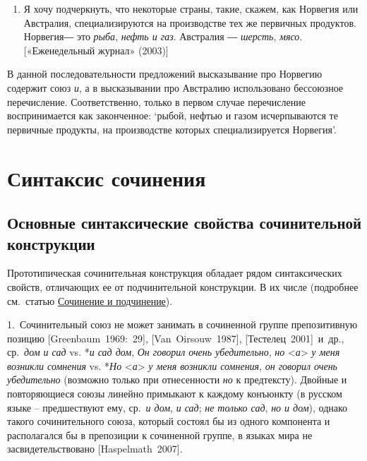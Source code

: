 \begin{enumerate}
\def\labelenumi{(\arabic{enumi})}
\setcounter{enumi}{65}
\item
  Я хочу подчеркнуть, что некоторые страны, такие, скажем, как Норвегия
  или Австралия, специализируются на производстве тех же первичных
  продуктов. Норвегия― это \emph{рыба}, \emph{нефть и газ}. Австралия ―
  \emph{шерсть}, \emph{мясо}. {[}«Еженедельный журнал» (2003){]}
\end{enumerate}

В данной последовательности предложений высказывание про Норвегию
содержит союз \emph{и}, а в высказывании про Австралию использовано
бессоюзное перечисление. Соответственно, только в первом случае
перечисление воспринимается как законченное: `рыбой, нефтью и газом
исчерпываются те первичные продукты, на производстве которых
специализируется Норвегия'.

\hypertarget{ux441ux438ux43dux442ux430ux43aux441ux438ux441-ux441ux43eux447ux438ux43dux435ux43dux438ux44f}{%
\section{Синтаксис
сочинения}\label{ux441ux438ux43dux442ux430ux43aux441ux438ux441-ux441ux43eux447ux438ux43dux435ux43dux438ux44f}}

\hypertarget{ux43eux441ux43dux43eux432ux43dux44bux435-ux441ux438ux43dux442ux430ux43aux441ux438ux447ux435ux441ux43aux438ux435-ux441ux432ux43eux439ux441ux442ux432ux430-ux441ux43eux447ux438ux43dux438ux442ux435ux43bux44cux43dux43eux439-ux43aux43eux43dux441ux442ux440ux443ux43aux446ux438ux438}{%
\subsection{Основные синтаксические свойства сочинительной
конструкции}\label{ux43eux441ux43dux43eux432ux43dux44bux435-ux441ux438ux43dux442ux430ux43aux441ux438ux447ux435ux441ux43aux438ux435-ux441ux432ux43eux439ux441ux442ux432ux430-ux441ux43eux447ux438ux43dux438ux442ux435ux43bux44cux43dux43eux439-ux43aux43eux43dux441ux442ux440ux443ux43aux446ux438ux438}}

Прототипическая сочинительная конструкция обладает рядом синтаксических
свойств, отличающих ее от подчинительной конструкции. В их числе
(подробнее см.~статью \underline{Сочинение и подчинение}).

1.~Сочинительный союз не может занимать в сочиненной группе
препозитивную позицию {[}Greenbaum~1969:~29{]}, {[}Van~Oirsouw~1987{]},
{[}Тестелец~2001{]}~и~др., ср.~\emph{дом и сад} vs. *\emph{и сад дом},
\emph{Он говорил очень убедительно}, \emph{но}
\textless{}\emph{а}\textgreater{} \emph{у меня возникли сомнения} vs.
*\emph{Но} \textless{}\emph{а}\textgreater{} \emph{у меня возникли
сомнения}, \emph{он говорил очень убедительно} (возможно только при
отнесенности \emph{но} к предтексту). Двойные и повторяющиеся союзы
линейно примыкают к каждому конъюнкту (в русском языке -- предшествуют
ему, ср.~\emph{и дом}, \emph{и сад}; \emph{не только сад}, \emph{но и
дом}), однако такого сочинительного союза, который состоял бы из одного
компонента и располагался бы в препозиции к сочиненной группе, в языках
мира не засвидетельствовано {[}Haspelmath~2007{]}.

